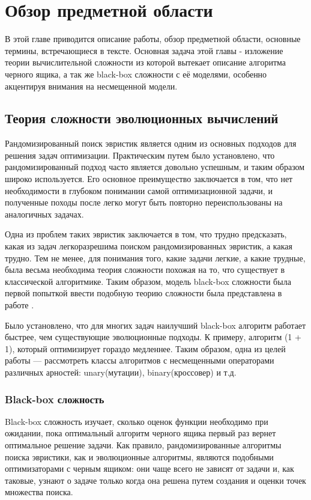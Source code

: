 \chapter{Обзор предметной области}
\label{chapter1}

В этой главе приводится описание работы, обзор предметной области, основные термины, встречающиеся в тексте. Основная задача этой главы - изложение теории вычислительной сложности из которой вытекает описание алгоритма черного ящика, а так же black-box сложности с её моделями, особенно акцентируя внимания на несмещенной модели.

\section{Теория сложности эволюционных вычислений}
Рандомизированный поиск эвристик является одним из основных подходов для решения задач оптимизации. Практическим путем было установлено, что рандомизированный подход часто является довольно успешным, и таким образом широко используется. Его основное преимущество заключается в том, что нет необходимости в глубоком понимании самой оптимизационной задачи, и полученные походы после легко могут быть повторно переиспользованы на аналогичных задачах.

Одна из проблем таких эвристик заключается в том, что трудно предсказать, какая из задач легкоразрешима поиском рандомизированных эвристик, а какая трудно. Тем не менее, для понимания того, какие задачи легкие, а какие трудные, была весьма необходима теория сложности похожая на то, что существует в классической алгоритмике. Таким образом, модель black-box сложности была первой попыткой ввести подобную теорию сложности была представлена в работе \cite{2}. 

Было установлено, что для многих задач наилучший black-box алгоритм работает быстрее, чем существующие эволюционные подходы. К примеру, алгоритм (1 + 1), который оптимизирует гораздо медленнее. Таким образом, одна из целей работы — рассмотреть классы алгоритмов с несмещенными операторами различных арностей: unary(мутации), binary(кроссовер) и т.д.

\subsection{Black-box сложность}

Black-box сложность изучает, сколько оценок функции необходимо при ожидании, пока оптимальный алгоритм черного ящика первый раз вернет оптимальное решение задачи. Как правило, рандомизированные алгоритмы поиска эвристики, как и эволюционные алгоритмы, являются подобными оптимизаторами с черным ящиком: они чаще всего не зависят от задачи и, как таковые, узнают о задаче только когда она решена путем создания и оценки точек множества поиска.


